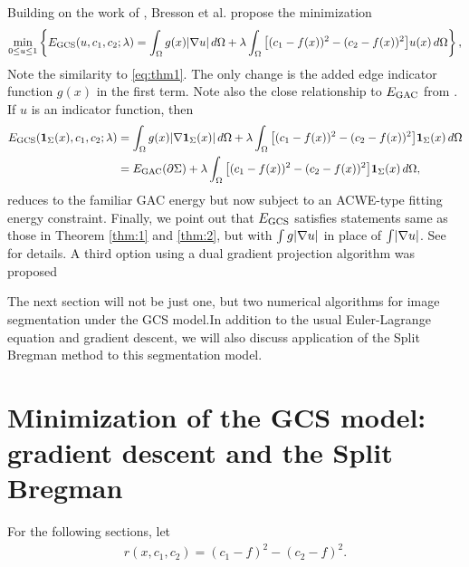 Building on the work of \cite{chan2006algorithms}, Bresson et al. \cite{bresson2007fast} propose the minimization 
\begin{align}
\min_{0\leq u \leq 1} \left\{
E_\textrm{GCS}(u, c_1, c_2; \lambda) 
= 
\int_{\Omega} g(x)  \lvert\nabla u\rvert \,d\Omega 
+ \lambda\int_{\Omega} \big[ (c_1 - f(x) )^2 - (c_2 - f(x))^2 \big] u(x) \,d\Omega
\right\},
\label{eq:min_gcs}
\end{align}
Note the similarity to \eqref{eq:thm1}. The only change is the added edge indicator function $g(x)$ in the first term. Note also the close relationship to $E_\textrm{GAC}$ from . If $u$ is an indicator function, then 
\begin{align*}
E_\textrm{GCS}(\mathbf{1}_\Sigma(x), c_1, c_2; \lambda) 
&= \int_{\Omega} g(x)  \lvert\nabla \mathbf{1}_\Sigma(x)\rvert \,d\Omega 
+ \lambda\int_{\Omega} \big[ (c_1 - f(x) )^2 - (c_2 - f(x))^2 \big] \mathbf{1}_\Sigma(x) \,d\Omega
\\
&= E_\textrm{GAC}(\partial \Sigma) +  \lambda\int_{\Omega} \big[ (c_1 - f(x) )^2 - (c_2 - f(x))^2 \big] \mathbf{1}_\Sigma(x) \,d\Omega,
\end{align*}
reduces to the familiar GAC energy but now subject to an ACWE-type fitting energy constraint. Finally, we point out that $E_\textrm{GCS}$ satisfies statements same as those in Theorem \ref{thm:1} and \ref{thm:2}, but with $\int g\lvert\nabla u\rvert$ in place of $\int \lvert\nabla u\rvert$. See \cite{bresson2007fast} for details. A third option using a dual gradient projection algorithm was proposed 

The next section will not be just one, but two numerical algorithms for image segmentation under the GCS model.In addition to the usual Euler-Lagrange equation and gradient descent, we will also discuss application of the Split Bregman method \cite{goldstein2010geometric,goldstein2009split} to this segmentation model. 

\section{Minimization of the GCS model: gradient descent and the Split Bregman}
For the following sections, let 
\begin{align*}
r(x, c_1, c_2) = (c_1 - f)^2 - (c_2 - f)^2.
\end{align*}

